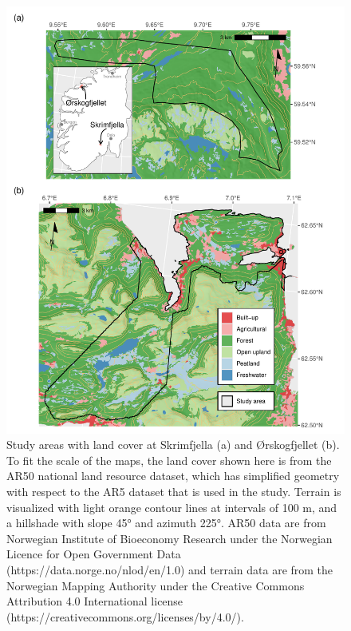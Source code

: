 \documentclass[soil, manuscript]{copernicus}
\begin{document}
\begin{figure}
\includegraphics[height=0.81\textheight]{figures/map-sites} \caption{Study areas with land cover at Skrimfjella (a) and Ørskogfjellet (b). To fit the scale of the maps, the land cover shown here is from the AR50 national land resource dataset, which has simplified geometry with respect to the AR5 dataset that is used in the study. Terrain is visualized with light orange contour lines at intervals of 100 m, and a hillshade with slope 45° and azimuth 225°. AR50 data are from Norwegian Institute of Bioeconomy Research under the Norwegian Licence for Open Government Data (https://data.norge.no/nlod/en/1.0) and terrain data are from the Norwegian Mapping Authority under the Creative Commons Attribution 4.0 International license (https://creativecommons.org/licenses/by/4.0/).}\label{fig:map-sites}
\end{figure}
\end{document}
